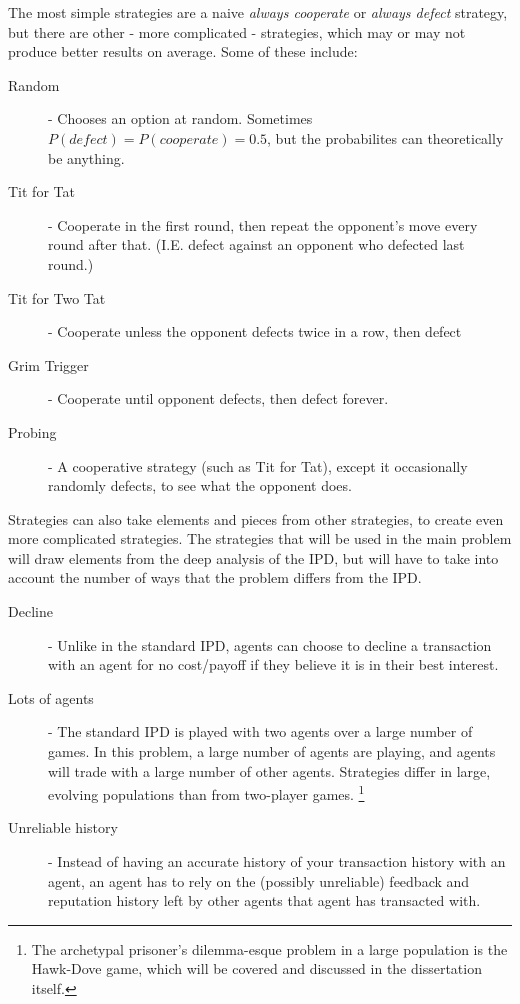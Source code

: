 \documentclass{article}
\begin{document}
The most simple strategies are a naive \emph{always cooperate} or \emph{always defect} strategy, but there are other - more complicated - strategies, which may or may not produce better results on average. Some of these include:
\begin{description}
	\item[Random] - Chooses an option at random. Sometimes $P(defect) = P(cooperate) = 0.5$, but the probabilites can theoretically be anything.
	\item[Tit for Tat] - Cooperate in the first round, then repeat the opponent's move every round after that. (I.E. defect against an opponent who defected last round.)
	\item[Tit for Two Tat] - Cooperate unless the opponent defects twice in a row, then defect
	\item[Grim Trigger] - Cooperate until opponent defects, then defect forever.
	\item[Probing] - A cooperative strategy (such as Tit for Tat), except it occasionally randomly defects, to see what the opponent does.
\end{description}

Strategies can also take elements and pieces from other strategies, to create even more complicated strategies. The strategies that will be used in the main problem will draw elements from the deep analysis of the IPD, but will have to take into account the number of ways that the problem differs from the IPD.

\begin{description}
	\item[Decline] - Unlike in the standard IPD, agents can choose to decline a transaction with an agent for no cost/payoff if they believe it is in their best interest.
	\item[Lots of agents] - The standard IPD is played with two agents over a large number of games. In this problem, a large number of agents are playing, and agents will trade with a large number of other agents. Strategies differ in large, evolving populations than from two-player games.\cite{stewart2013extortion} \footnote{The archetypal prisoner's dilemma-esque problem in a large population is the Hawk-Dove game, which will be covered and discussed in the dissertation itself.}
	\item[Unreliable history] - Instead of having an accurate history of your transaction history with an agent, an agent has to rely on the (possibly unreliable) feedback and reputation history left by other agents that agent has transacted with.
\end{description}
\end{document}
